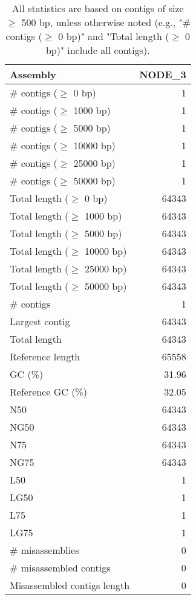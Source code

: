\documentclass[12pt,a4paper]{article}
\begin{document}
\begin{table}[ht]
\begin{center}
\caption{All statistics are based on contigs of size $\geq$ 500 bp, unless otherwise noted (e.g., "\# contigs ($\geq$ 0 bp)" and "Total length ($\geq$ 0 bp)" include all contigs).}
\begin{tabular}{|l*{1}{|r}|}
\hline
Assembly & NODE\_3 \\ \hline
\# contigs ($\geq$ 0 bp) & 1 \\ \hline
\# contigs ($\geq$ 1000 bp) & 1 \\ \hline
\# contigs ($\geq$ 5000 bp) & 1 \\ \hline
\# contigs ($\geq$ 10000 bp) & 1 \\ \hline
\# contigs ($\geq$ 25000 bp) & 1 \\ \hline
\# contigs ($\geq$ 50000 bp) & 1 \\ \hline
Total length ($\geq$ 0 bp) & 64343 \\ \hline
Total length ($\geq$ 1000 bp) & 64343 \\ \hline
Total length ($\geq$ 5000 bp) & 64343 \\ \hline
Total length ($\geq$ 10000 bp) & 64343 \\ \hline
Total length ($\geq$ 25000 bp) & 64343 \\ \hline
Total length ($\geq$ 50000 bp) & 64343 \\ \hline
\# contigs & 1 \\ \hline
Largest contig & 64343 \\ \hline
Total length & 64343 \\ \hline
Reference length & 65558 \\ \hline
GC (\%) & 31.96 \\ \hline
Reference GC (\%) & 32.05 \\ \hline
N50 & 64343 \\ \hline
NG50 & 64343 \\ \hline
N75 & 64343 \\ \hline
NG75 & 64343 \\ \hline
L50 & 1 \\ \hline
LG50 & 1 \\ \hline
L75 & 1 \\ \hline
LG75 & 1 \\ \hline
\# misassemblies & 0 \\ \hline
\# misassembled contigs & 0 \\ \hline
Misassembled contigs length & 0 \\ \hline

\end{tabular}
\end{center}
\end{table}
\end{document}
